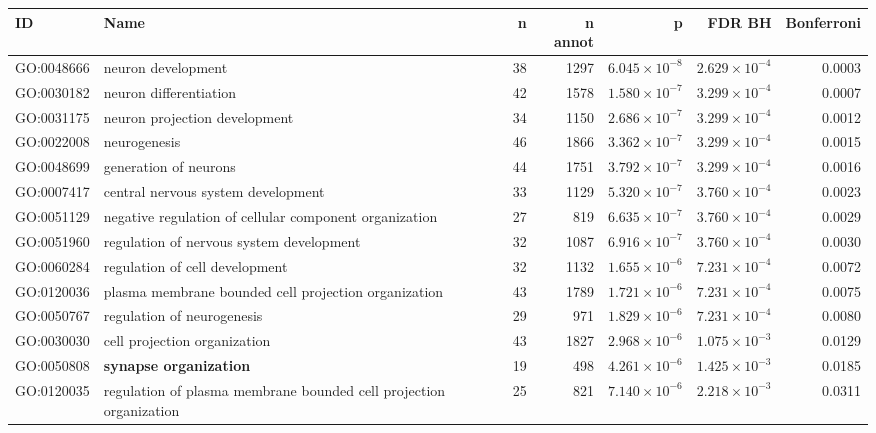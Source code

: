 \begin{table}[ht]
\centering
\begin{adjustbox}{width=\textwidth}

\begin{tabular}{llrrrrr}
  \hline
ID & Name & n & n annot & p & FDR BH & Bonferroni \\ 
  \hline
GO:0048666 & neuron development & 38 & 1297 & $6.045 \times 10^{-8}$ & $2.629 \times 10^{-4}$ & 0.0003 \\ 
  GO:0030182 & neuron differentiation & 42 & 1578 & $1.580 \times 10^{-7}$ & $3.299 \times 10^{-4}$ & 0.0007 \\ 
  GO:0031175 & neuron projection development & 34 & 1150 & $2.686 \times 10^{-7}$ & $3.299 \times 10^{-4}$ & 0.0012 \\ 
  GO:0022008 & neurogenesis & 46 & 1866 & $3.362 \times 10^{-7}$ & $3.299 \times 10^{-4}$ & 0.0015 \\ 
  GO:0048699 & generation of neurons & 44 & 1751 & $3.792 \times 10^{-7}$ & $3.299 \times 10^{-4}$ & 0.0016 \\ 
  GO:0007417 & central nervous system development & 33 & 1129 & $5.320 \times 10^{-7}$ & $3.760 \times 10^{-4}$ & 0.0023 \\ 
  GO:0051129 & negative regulation of cellular component organization & 27 & 819 & $6.635 \times 10^{-7}$ & $3.760 \times 10^{-4}$ & 0.0029 \\ 
  GO:0051960 & regulation of nervous system development & 32 & 1087 & $6.916 \times 10^{-7}$ & $3.760 \times 10^{-4}$ & 0.0030 \\ 
  GO:0060284 & regulation of cell development & 32 & 1132 & $1.655 \times 10^{-6}$ & $7.231 \times 10^{-4}$ & 0.0072 \\ 
  GO:0120036 & plasma membrane bounded cell projection organization & 43 & 1789 & $1.721 \times 10^{-6}$ & $7.231 \times 10^{-4}$ & 0.0075 \\ 
  GO:0050767 & regulation of neurogenesis & 29 & 971 & $1.829 \times 10^{-6}$ & $7.231 \times 10^{-4}$ & 0.0080 \\ 
  GO:0030030 & cell projection organization & 43 & 1827 & $2.968 \times 10^{-6}$ & $1.075 \times 10^{-3}$ & 0.0129 \\ 
  GO:0050808 & \textbf{synapse organization} & 19 & 498 & $4.261 \times 10^{-6}$ & $1.425 \times 10^{-3}$ & 0.0185 \\ 
  GO:0120035 & regulation of plasma membrane bounded cell projection organization & 25 & 821 & $7.140 \times 10^{-6}$ & $2.218 \times 10^{-3}$ & 0.0311 \\ 

\end{tabular}
\end{adjustbox}
\end{table}
